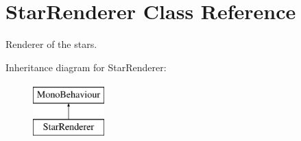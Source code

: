 \hypertarget{class_star_renderer}{}\section{Star\+Renderer Class Reference}
\label{class_star_renderer}


Renderer of the stars.  


Inheritance diagram for Star\+Renderer\+:\begin{figure}[H]
\begin{center}
\leavevmode
\includegraphics[height=2.000000cm]{class_star_renderer}
\end{center}
\end{figure}
